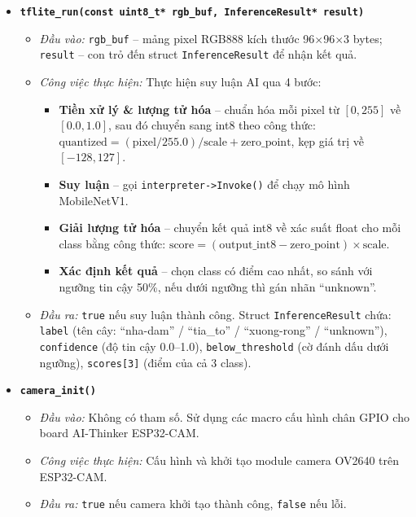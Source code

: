 \documentclass[12pt,a4paper]{report}
\begin{document}
\begin{itemize}
    \item \textbf{\texttt{tflite\_run(const uint8\_t* rgb\_buf, InferenceResult* result)}}
    \begin{itemize}
        \item \textit{Đầu vào:} \texttt{rgb\_buf} -- mảng pixel RGB888 kích thước
        96$\times$96$\times$3 bytes; \texttt{result} -- con trỏ đến struct
        \texttt{InferenceResult} để nhận kết quả.
        \item \textit{Công việc thực hiện:} Thực hiện suy luận AI qua 4 bước:
        \begin{itemize}
            \item \textbf{Tiền xử lý \& lượng tử hóa} -- chuẩn hóa mỗi pixel từ
            $[0, 255]$ về $[0.0, 1.0]$, sau đó chuyển sang int8 theo công thức:
            $\text{quantized} = (\text{pixel} / 255.0) / \text{scale} +
            \text{zero\_point}$, kẹp giá trị về $[-128, 127]$.
            \item \textbf{Suy luận} -- gọi \texttt{interpreter->Invoke()} để chạy
            mô hình MobileNetV1.
            \item \textbf{Giải lượng tử hóa} -- chuyển kết quả int8 về xác suất
            float cho mỗi class bằng công thức: $\text{score} =
            (\text{output\_int8} - \text{zero\_point}) \times \text{scale}$.
            \item \textbf{Xác định kết quả} -- chọn class có điểm cao nhất, so
            sánh với ngưỡng tin cậy 50\%, nếu dưới ngưỡng thì gán nhãn
            ``unknown''.
        \end{itemize}
        \item \textit{Đầu ra:} \texttt{true} nếu suy luận thành công. Struct
        \texttt{InferenceResult} chứa: \texttt{label} (tên cây: ``nha-dam'' /
        ``tia\_to'' / ``xuong-rong'' / ``unknown''), \texttt{confidence} (độ tin
        cậy 0.0--1.0), \texttt{below\_threshold} (cờ đánh dấu dưới ngưỡng),
        \texttt{scores[3]} (điểm của cả 3 class).
    \end{itemize}

    \item \textbf{\texttt{camera\_init()}}
    \begin{itemize}
        \item \textit{Đầu vào:} Không có tham số. Sử dụng các macro cấu hình chân
        GPIO cho board AI-Thinker ESP32-CAM.
        \item \textit{Công việc thực hiện:} Cấu hình và khởi tạo module camera
        OV2640 trên ESP32-CAM.
        \item \textit{Đầu ra:} \texttt{true} nếu camera khởi tạo thành công,
        \texttt{false} nếu lỗi.
    \end{itemize}


\end{itemize}
\end{document}
